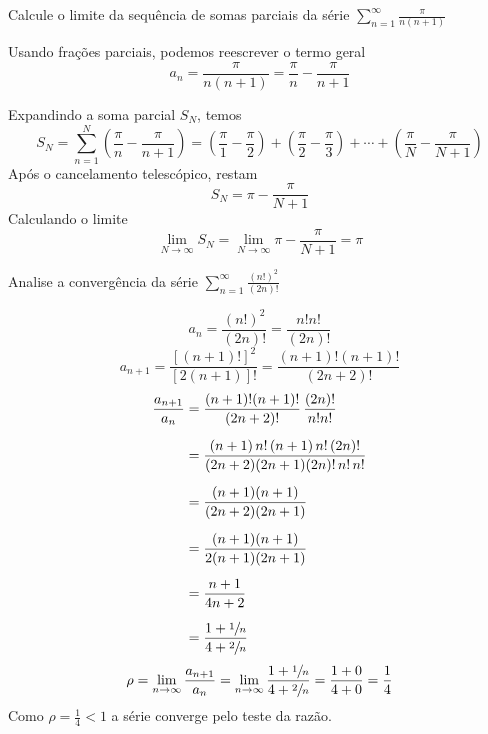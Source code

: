 \documentclass[a4paper,12pt,fleqn]{article}
\begin{document}

\addGrowthOrder

Calcule o limite da sequência de somas parciais da série \;
\(
  \sum_{n=1}^\infty \frac{\pi}{n(n+1)}
\)

\begin{answer}
  Usando frações parciais, podemos reescrever o termo geral
  \[
    a_n
    = \frac{\pi}{n(n+1)}
    = \frac{\pi}{n} - \frac{\pi}{n+1}
  \]

  Expandindo a soma parcial \( S_N \), temos
  \[
    S_N
    = \sum_{n=1}^N \left( \frac{\pi}{n} - \frac{\pi}{n+1} \right)
    = \left( \frac{\pi}{1} - \frac{\pi}{2} \right)
    + \left( \frac{\pi}{2} - \frac{\pi}{3} \right)
    + \cdots
    + \left( \frac{\pi}{N} - \frac{\pi}{N+1} \right)
  \]
  Após o cancelamento telescópico, restam
  \[
    S_N = \pi - \frac{\pi}{N+1}
  \]
  Calculando o limite
  \[
    \lim_{N \to \infty} S_N
    = \lim_{N \to \infty} \pi - \frac{\pi}{N+1}
    = \pi
  \]
\end{answer}

Analise a convergência da série \;
\(
  \sum_{n=1}^\infty \frac{(n!)^2}{(2n)!}
\)

\begin{answer}
  \[
    a_n
    = \frac{(n!)^2}{(2n)!}
    = \frac{n!n!}{(2n)!}
  \]
  \[
    a_{n+1}
    = \frac{[(n+1)!]^2}{[2(n+1)]!}
    = \frac{(n+1)!(n+1)!}{(2n+2)!}
  \]
  \begin{align*}
    \frac{a_{n+1}}{a_n}
    & = \frac{(n+1)!(n+1)!}{(2n+2)!}\,\frac{(2n)!}{n!n!} \\[2mm]
    & = \frac{(n+1)\,n!\,(n+1)\,n!\,(2n)!}{(2n+2)(2n+1)(2n)!\,n!\,n!} \\[2mm]
    & = \frac{(n+1)(n+1)}{(2n+2)(2n+1)} \\[2mm]
    & = \frac{(n+1)(n+1)}{2(n+1)(2n+1)} \\[2mm]
    & = \frac{n+1}{4n+2} \\[2mm]
    & = \frac{1+\sfrac{1}{n}}{4+\sfrac{2}{n}}
  \end{align*}
  \[
    \rho
    = \lim_{n\to\infty} \frac{a_{n+1}}{a_n}
    = \lim_{n\to\infty} \frac{1+\sfrac{1}{n}}{4+\sfrac{2}{n}}
    = \frac{1 + 0}{4 + 0}
    = \frac{1}{4}
  \]
  Como \(\rho = \frac{1}{4} < 1\) a série converge pelo teste da razão.
\end{answer}
\end{document}
